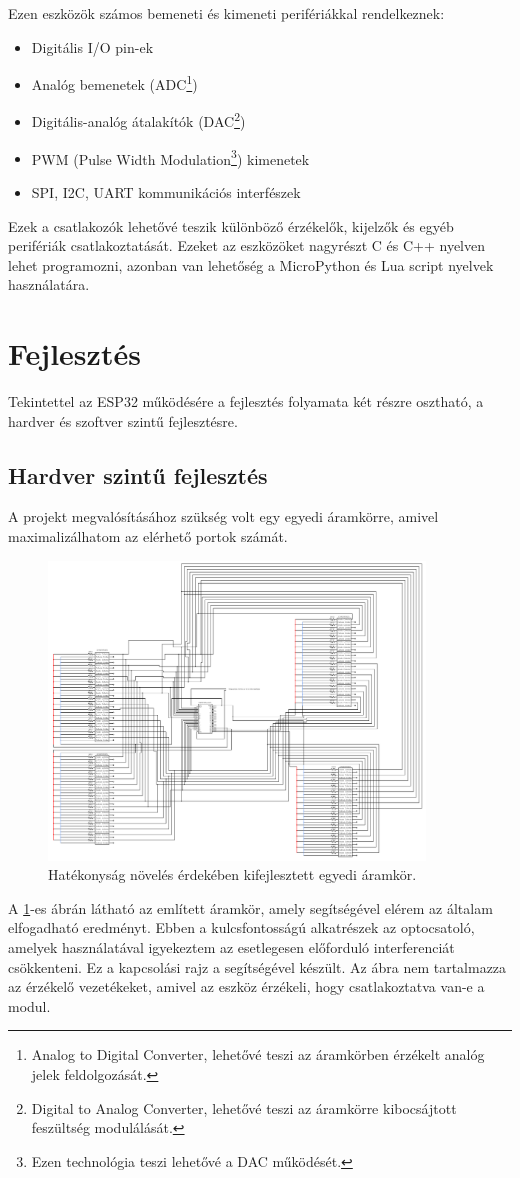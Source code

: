\documentclass{thesis-ekf}
\theoremstyle{definition}
\theoremstyle{remark}
\begin{document}
	Ezen eszközök számos bemeneti és kimeneti perifériákkal rendelkeznek:
	\begin{itemize}
		\item Digitális I/O pin-ek
		\item Analóg bemenetek (ADC\footnote{Analog to Digital Converter, lehetővé teszi az áramkörben érzékelt analóg jelek feldolgozását.})
		\item Digitális-analóg átalakítók (DAC\footnote{Digital to Analog Converter, lehetővé teszi az áramkörre kibocsájtott feszültség modulálását.})
		\item PWM (Pulse Width Modulation\footnote{Ezen technológia teszi lehetővé a DAC működését.}) kimenetek
		\item SPI, I2C, UART kommunikációs interfészek
	\end{itemize}
	Ezek a csatlakozók lehetővé teszik különböző érzékelők, kijelzők és egyéb perifériák csatlakoztatását.
	Ezeket az eszközöket nagyrészt C és C++ nyelven lehet programozni, azonban van lehetőség a MicroPython és Lua script nyelvek használatára.
	\section{Fejlesztés}
	Tekintettel az ESP32 működésére a fejlesztés folyamata két részre osztható, a hardver és szoftver szintű fejlesztésre.
	\subsection{Hardver szintű fejlesztés}
	A projekt megvalósításához szükség volt egy egyedi áramkörre, amivel maximalizálhatom az elérhető portok számát.
	\begin{figure}[!ht]
		\centering
		\includegraphics[width=10cm]{circuit}
		\caption{Hatékonyság növelés érdekében kifejlesztett egyedi áramkör.}
		\label{img_circ}
	\end{figure}
	A \ref{img_circ}-es ábrán látható az említett áramkör, amely segítségével elérem az általam elfogadható eredményt. Ebben a kulcsfontosságú alkatrészek az optocsatoló, amelyek használatával igyekeztem  az esetlegesen előforduló interferenciát csökkenteni.
	Ez a kapcsolási rajz a \href{https://www.circuit-diagram.org/}{\color{blue}{Circuit Diagram}} segítségével készült.
	Az ábra nem tartalmazza az érzékelő vezetékeket, amivel az eszköz érzékeli, hogy csatlakoztatva van-e a modul.
	
\end{document}
